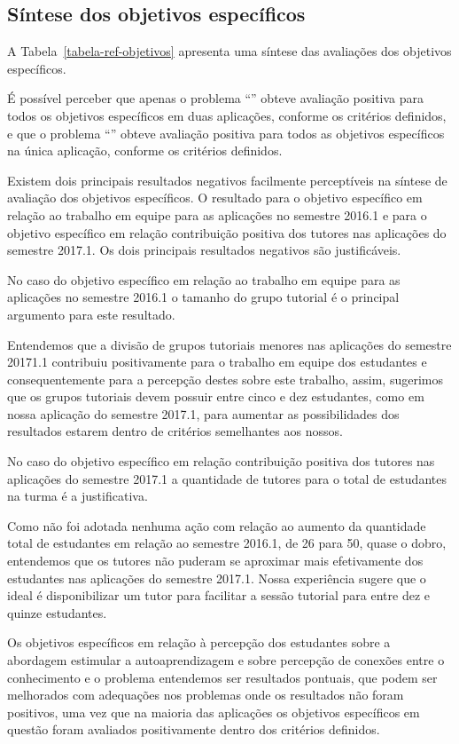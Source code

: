 \subsection{Síntese dos objetivos específicos}
A Tabela~\ref{tabela-ref-objetivos} apresenta
uma síntese das avaliações dos objetivos específicos.


É possível perceber que apenas o problema ``\ProblemaD'' obteve
avaliação positiva para todos os objetivos específicos em duas
aplicações, conforme os critérios definidos, e que o
problema ``\ProblemaA'' obteve avaliação positiva para todos as
objetivos específicos na única aplicação, conforme os
critérios definidos.

Existem dois principais resultados negativos facilmente
perceptíveis na síntese de avaliação dos objetivos
específicos.
O resultado para o objetivo específico em relação ao trabalho em equipe
para as aplicações no semestre 2016.1 e para o objetivo
específico em relação contribuição positiva dos tutores nas
aplicações do semestre 2017.1.
Os dois principais resultados negativos são justificáveis.

No caso do objetivo específico em relação ao trabalho em equipe
para as aplicações no semestre 2016.1 o tamanho
do grupo tutorial é o principal argumento
para este resultado.

Entendemos que a divisão de grupos tutoriais menores
nas aplicações do semestre 20171.1 contribuiu
positivamente para o trabalho em equipe dos
estudantes e consequentemente para a percepção destes
sobre este trabalho, assim, sugerimos que os
grupos tutoriais devem possuir entre cinco e dez estudantes,
como em nossa aplicação do semestre 2017.1, para aumentar
as possibilidades dos resultados estarem dentro de critérios
semelhantes aos nossos.

No caso do objetivo específico em relação contribuição positiva
dos tutores nas aplicações do semestre 2017.1 a quantidade de
tutores para o total de estudantes na turma é a justificativa.

Como não foi adotada nenhuma ação com relação ao aumento da
quantidade total de estudantes em relação ao semestre 2016.1,
de 26 para 50, quase o dobro, entendemos que os tutores não
puderam se aproximar mais efetivamente dos estudantes
nas aplicações do semestre 2017.1.
Nossa experiência sugere que o ideal é disponibilizar um
tutor para facilitar a sessão tutorial para entre dez e
quinze estudantes.

Os objetivos específicos em relação à percepção dos estudantes sobre
a abordagem estimular a autoaprendizagem e sobre percepção de
conexões entre o conhecimento e o problema entendemos ser
resultados pontuais, que podem ser melhorados com adequações nos problemas
onde os resultados não foram positivos, uma vez que na maioria das aplicações
os objetivos específicos em questão foram avaliados positivamente
dentro dos critérios definidos.
